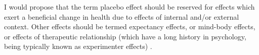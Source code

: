 I would propose that the term placebo effect should be reserved for effects which exert a beneficial change in health due to effects of internal and/or external context. Other effects should be termed expectancy effects, or mind-body effects, or effects of therapeutic relationship (which have a long history in psychology, being typically known as experimenter effects) \cite{rosenthal1969interpersonal,rosenthal1967covert,Rosenthal1956}.  



